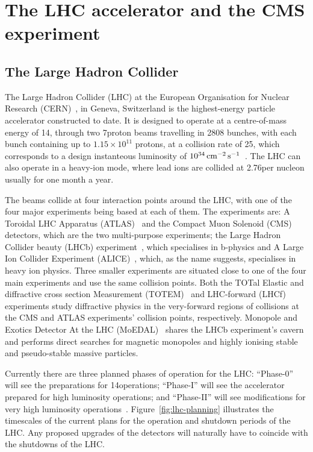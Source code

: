 \chapter{The LHC accelerator and the CMS experiment}\label{chapter:lhc-cms}
\section{The Large Hadron Collider}\label{sec:lhc}

The Large Hadron Collider (LHC) at the European Organisation for Nuclear Research (CERN)~\cite{Bruning:782076}, in Geneva, Switzerland is the highest-energy particle accelerator constructed to date. 
It is designed to operate at a centre-of-mass energy of 14\TeV, through two 7\TeV proton beams travelling in 2808 bunches, with each bunch containing up to $1.15 \times 10^{11}$ protons, at a collision rate of 25\ns, which corresponds to a design instanteous luminosity of $10^{34}\,\text{cm}^\text{$-$2}\,\text{s}^\text{$-$1}$~\cite{Bayatian:2006zz}. 
The LHC can also operate in a heavy-ion mode, where lead ions are collided at 2.76\TeV per nucleon usually for one month a year.

The beams collide at four interaction points around the LHC, with one of the four major experiments being based at each of them. 
The experiments are: A Toroidal LHC Apparatus (ATLAS)~\cite{Aad:2008zzm} and the Compact Muon Solenoid (CMS)~\cite{oldcms} detectors, which are the two multi-purpose experiments; the Large Hadron Collider beauty (LHCb) experiment~\cite{Alves:2008zz}, which specialises in b-physics and A Large Ion Collider Experiment (ALICE)~\cite{Aamodt:2008zz}, which, as the name suggests, specialises in heavy ion physics.
Three smaller experiments are situated close to one of the four main experiments and use the same collision points.
Both the TOTal Elastic and diffractive cross section Measurement (TOTEM)~\cite{Anelli:2008zza} and LHC-forward (LHCf)~\cite{Adriani:2008zz} experiments study diffractive physics in the very-forward regions of collisions at the CMS and ATLAS experiments' collision points, respectively.
Monopole and Exotics Detector At the LHC (MoEDAL)~\cite{Pinfold:2009oia} shares the LHCb experiment's cavern and performs direct searches for magnetic monopoles and highly ionising stable and pseudo-stable massive particles.

Currently there are three planned phases of operation for the LHC: ``Phase-0'' will see the preparations for 14\TeV operations; ``Phase-I'' will see the accelerator prepared for high luminosity operations; and ``Phase-II'' will see modifications for very high luminosity operations~\cite{ECFA}. 
Figure~\ref{fig:lhc-planning} illustrates the timescales of the current plans for the operation and shutdown periods of the LHC.
Any proposed upgrades of the detectors will naturally have to coincide with the shutdowns of the LHC.

